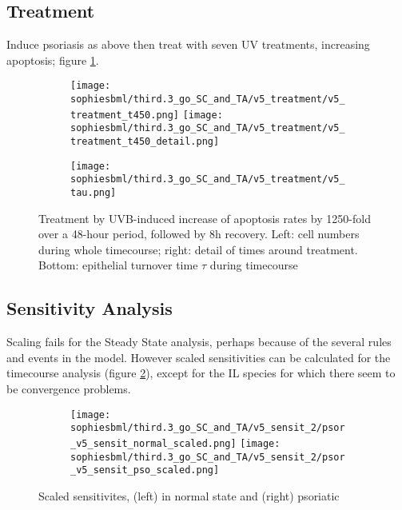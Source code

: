 \documentclass[a4paper,10pt]{report}
\newcommand{\psortbase}{/home/ngrs2/work/bsu/PSORT_Zuliani_Reynolds/}
\newcommand{\sbmlbase}{\psortbase/sbml-sh/}
\newcommand{\sophiesbml}{\sbmlbase/sophie_like}
\begin{document}
\subsection{Treatment}

Induce psoriasis as above then treat with seven UV treatments, 
increasing apoptosis; figure \ref{fig:thirdpoint3sophie_treatment}.

\begin{figure}[h!]
  \begin{subfigure}{\textwidth}
    \texttt{[image: \\sophiesbml/third.3\_go\_SC\_and\_TA/v5\_treatment/v5\_treatment\_t450.png]}
    \texttt{[image: \\sophiesbml/third.3\_go\_SC\_and\_TA/v5\_treatment/v5\_treatment\_t450\_detail.png]}
  \end{subfigure}
  \begin{subfigure}{\textwidth}
    \texttt{[image: \\sophiesbml/third.3\_go\_SC\_and\_TA/v5\_treatment/v5\_tau.png]}
  \end{subfigure}
  \caption{Treatment by UVB-induced increase of apoptosis rates by 1250-fold over a 48-hour period, followed by 8h recovery. Left: cell numbers during whole timecourse; right: detail of times around treatment. Bottom: epithelial turnover time $\tau$ during timecourse}
  \label{fig:thirdpoint3sophie_treatment}
\end{figure}


\subsection{Sensitivity Analysis}

Scaling fails for the Steady State analysis,  perhaps because of the 
several rules and events in the model. However scaled sensitivities
can be calculated for the timecourse analysis (figure \ref{fig:thirdpoint3sophie_sensit}), except for the IL species for which there seem to be convergence problems. 

\begin{figure}[h!]
  \begin{subfigure}{\textwidth}
    \texttt{[image: \\sophiesbml/third.3\_go\_SC\_and\_TA/v5\_sensit\_2/psor\_v5\_sensit\_normal\_scaled.png]}
    \texttt{[image: \\sophiesbml/third.3\_go\_SC\_and\_TA/v5\_sensit\_2/psor\_v5\_sensit\_pso\_scaled.png]}
  \end{subfigure}
  \caption{Scaled sensitivites, (left) in normal state and (right) psoriatic }
  \label{fig:thirdpoint3sophie_sensit}
\end{figure}
\end{document}
